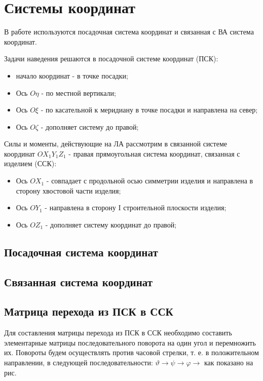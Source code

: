 \section{Системы координат}
В работе используются посадочная система координат и связанная с ВА система координат.

Задачи наведения решаются в посадочной системе координат (ПСК):
\begin{itemize}
	\item начало координат - в точке посадки;
	\item Ось $O \eta$ - по местной вертикали;
	\item Ось $O \xi$ - по касательной к меридиану в точке посадки и направлена на север;
	\item Ось $O \zeta$ - дополняет систему до правой;
\end{itemize}


Силы и моменты, действующие на ЛА рассмотрим в связанной системе координат $O X_1 Y_1 Z_1$ - правая прямоугольная система координат, связанная с изделием (ССК):
\begin{itemize}
	\item Ось $O X_1$ - совпадает с продольной осью симметрии изделия и направлена в сторону хвостовой части изделия;
	\item Ось $O Y_1$ - направлена в сторону I строительной плоскости изделия;
	\item Ось $O Z_1$ - дополняет систему координат до правой;
\end{itemize}

\clearpage

\subsection{Посадочная система координат}


\clearpage

\subsection{Связанная система координат}

\clearpage

\subsection{Матрица перехода из ПСК в ССК}
Для составления матрицы перехода из ПСК в ССК необходимо составить элементарные матрицы последовательного поворота на один угол и перемножить их. Повороты будем осуществлять против часовой стрелки, т. е. в положительном направлении, в следующей последовательности: $\vartheta \rightarrow \psi \rightarrow \varphi \rightarrow$ как показано на рис. 

